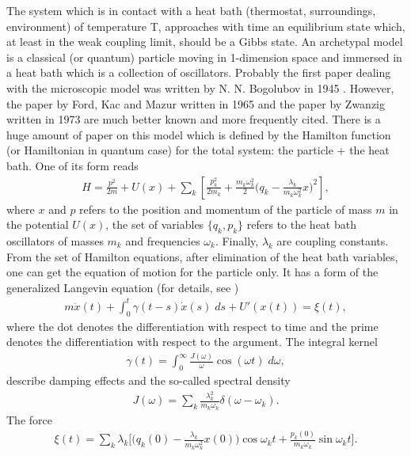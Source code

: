 \documentclass[authoryear,draft,1p,times]{elsarticle}
\renewcommand{\=}{\stackrel{\mathrm{d}}{=}}
\begin{document}
The system which is in contact with a heat bath (thermostat, 
surroundings, environment) 
of temperature T, approaches with time  an  equilibrium state which, 
at least in the weak coupling limit, should be  
a Gibbs state. An archetypal model is a classical (or quantum) particle 
moving in 1-dimension space and 
immersed in a heat bath which is a collection  of oscillators. Probably the 
first paper dealing with the microscopic model was  written 
by N. N. Bogolubov
in 1945 \cite{bogol}.   However, the paper by Ford, Kac and 
Mazur written in 1965 \cite{kac} and the paper by Zwanzig written in 1973 
\cite{zwan} 
are much  better known and more frequently cited. There is a huge amount of paper 
on this model which 
is defined by the Hamilton function (or Hamiltonian in 
 quantum case) 
for the total system: the particle + the heat bath. One of its form  reads 
%
\begin{eqnarray}
\label{H}
H=\frac{p^2}{2m} + U(x) + \sum_k \left[\frac{p_k^2}{2m_k} 
+ \frac{m_k\omega_k^2}{2}
\Big(q_k - \frac{\lambda_k}{m_k\omega_k^2} x\Big)^2\right],
\end{eqnarray}
%
where $x$ and $p$ refers to the position and momentum  of the particle 
of mass $m$ in the potential $U(x)$, 
the set of variables $\{q_k, p_k\}$ refers 
to the heat bath oscillators of masses $m_k$ and frequencies $\omega_k$. 
Finally,  $\lambda_k$ are coupling constants. 
From the set of  Hamilton equations, after elimination of the 
heat bath variables, 
one can get  the equation of motion for the particle only. 
It has a form of the 
generalized Langevin equation (for details, see \cite{peter1})
%
\begin{eqnarray}
\label{Gen}
m\ddot x(t) + \int_0^t \gamma(t-s) \dot x(s)\;ds + U'(x(t))= \xi(t) , 
\end{eqnarray}
where the dot denotes the differentiation with respect to time  and 
the prime denotes the differentiation with respect to  the argument. 
The integral kernel 
%
\begin{eqnarray}
\label{gamma}
\gamma(t)= \int_0^\infty \frac{J(\omega)}{\omega} \cos(\omega t) \;d\omega, 
\end{eqnarray}
%
describe damping effects and the so-called spectral density 
%
\begin{eqnarray}
\label{spect}
J(\omega)= \sum_k \frac{\lambda_k^2}{m_k\omega_k} \delta(\omega-\omega_k).
\end{eqnarray}
%
The force 
%
\begin{eqnarray}
\label{xi}
\xi(t)  = \sum_k \lambda_k\Big[\Big (q_k(0)- 
\frac{\lambda_k}{m_k\omega_k^2} x(0)\Big )   \cos \omega_k t  
+ \frac{p_k(0)}{m_k\omega_k} \sin \omega_k t\Big].
\end{eqnarray}
\end{document}
